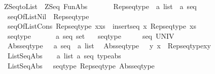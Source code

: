 %
\begin{isabellebody}%
\def\isabellecontext{ZSeqtoList}%
%
\isamarkuptrue%
%
\isadelimtheory
%
\endisadelimtheory
%
\isatagtheory
{}\isamarkupfalse%
\ ZSeqtoList\ \ ZSeq\ FunAbs\ %
\endisatagtheory
{\isafoldtheory}%
%
\isadelimtheory
%
\endisadelimtheory
\ \isanewline
\isanewline
{}\isamarkupfalse%
\isanewline
\ \ \ \ Rep{\isacharunderscore}seqtype\ {\isacharcolon}{\isacharcolon}\ {\isachardoublequoteopen}{\isacharprime}a\ list\ {\isacharequal}{\isachargreater}\ {\isacharparenleft}{\isacharprime}a\ seq{\isacharparenright}{\isachardoublequoteclose}\isanewline
\isanewline
{}\isamarkupfalse%
\ \isanewline
\ \ seqOfList{\isacharunderscore}Nil{\isacharcolon}\ \ {\isachardoublequoteopen}Rep{\isacharunderscore}seqtype\ {\isacharbrackleft}{\isacharbrackright}\ {\isacharequal}\ {\isacharpercent}{\isacharless}{\isacharpercent}{\isachargreater}{\isachardoublequoteclose}\isanewline
\ \ seqOfList{\isacharunderscore}Cons{\isacharcolon}\ {\isachardoublequoteopen}Rep{\isacharunderscore}seqtype\ {\isacharparenleft}x{\isacharhash}xs{\isacharparenright}\ {\isacharequal}\ insertseq\ x\ {\isacharparenleft}Rep{\isacharunderscore}seqtype\ xs{\isacharparenright}{\isachardoublequoteclose}\isanewline
\isanewline
{}\isamarkupfalse%
\isanewline
\isanewline
\ \ seqtype\ \ \ \ \ \ {\isacharcolon}{\isacharcolon}\ {\isachardoublequoteopen}{\isacharparenleft}{\isacharprime}a\ seq{\isacharparenright}\ set{\isachardoublequoteclose}\ \isanewline
\ \ {\isachardoublequoteopen}seqtype\ \ \ \ \ {\isacharequal}{\isacharequal}\ seq\ UNIV{\isachardoublequoteclose}\isanewline
\ \ Abs{\isacharunderscore}seqtype\ \ {\isacharcolon}{\isacharcolon}\ {\isachardoublequoteopen}{\isacharparenleft}{\isacharprime}a\ seq{\isacharparenright}\ {\isacharequal}{\isachargreater}\ {\isacharprime}a\ list{\isachardoublequoteclose}\isanewline
\ \ {\isachardoublequoteopen}Abs{\isacharunderscore}seqtype\ {\isacharequal}{\isacharequal}\ {\isacharparenleft}{\isacharpercent}\ y{\isachardot}\ {\isacharat}x\ {\isachardot}\ Rep{\isacharunderscore}seqtype{\isacharparenleft}x{\isacharparenright}{\isacharequal}y{\isacharparenright}{\isachardoublequoteclose}\isanewline
\ \ ListSeqAbs\ \ \ {\isacharcolon}{\isacharcolon}\ {\isachardoublequoteopen}{\isacharparenleft}{\isacharprime}a\ list{\isacharcomma}\ {\isacharprime}a\ seq{\isacharparenright}\ typeabs{\isachardoublequoteclose}\isanewline
\ \ {\isachardoublequoteopen}ListSeqAbs\ \ {\isacharequal}{\isacharequal}\ {\isacharparenleft}seqtype{\isacharcomma}\ Rep{\isacharunderscore}seqtype{\isacharcomma}\ Abs{\isacharunderscore}seqtype{\isacharparenright}{\isachardoublequoteclose}\isanewline

\end{isabellebody}
